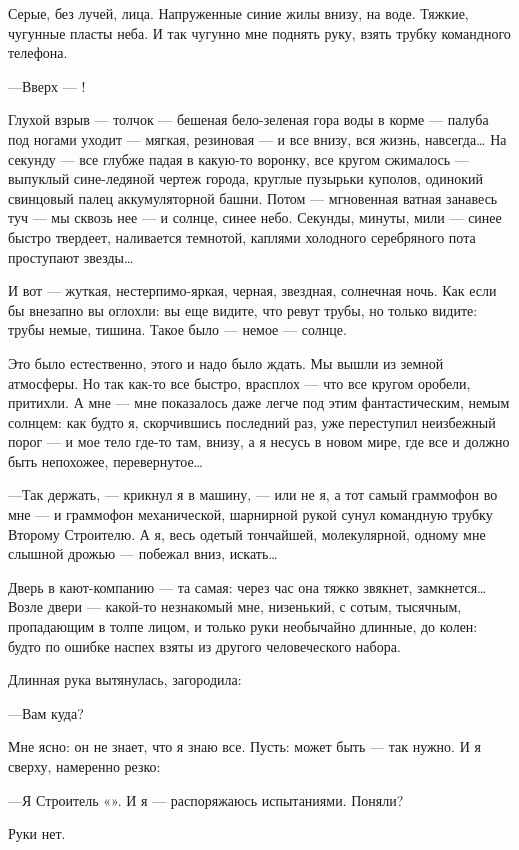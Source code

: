 \documentclass[11pt,openany]{book}
\begin{document}
Серые, без лучей, лица. Напруженные синие жилы внизу, на воде. Тяжкие, чугунные пласты неба. И так чугунно мне поднять руку, взять трубку командного телефона.

---Вверх --- !

Глухой взрыв --- толчок --- бешеная бело-зеленая гора воды в корме --- палуба под ногами уходит --- мягкая, резиновая --- и все внизу, вся жизнь, навсегда\ldots{} На секунду --- все глубже падая в какую-то воронку, все кругом сжималось --- выпуклый сине-ледяной чертеж города, круглые пузырьки куполов, одинокий свинцовый палец аккумуляторной башни. Потом --- мгновенная ватная занавесь туч --- мы сквозь нее --- и солнце, синее небо. Секунды, минуты, мили --- синее быстро твердеет, наливается темнотой, каплями холодного серебряного пота проступают звезды\ldots{}

И вот --- жуткая, нестерпимо-яркая, черная, звездная, солнечная ночь. Как если бы внезапно вы оглохли: вы еще видите, что ревут трубы, но только видите: трубы немые, тишина. Такое было --- немое --- солнце.

Это было естественно, этого и надо было ждать. Мы вышли из земной атмосферы. Но так как-то все быстро, врасплох --- что все кругом оробели, притихли. А мне --- мне показалось даже легче под этим фантастическим, немым солнцем: как будто я, скорчившись последний раз, уже переступил неизбежный порог --- и мое тело где-то там, внизу, а я несусь в новом мире, где все и должно быть непохожее, перевернутое\ldots{}

---Так держать, --- крикнул я в машину, --- или не я, а тот самый граммофон во мне --- и граммофон механической, шарнирной рукой сунул командную трубку Второму Строителю. А я, весь одетый тончайшей, молекулярной, одному мне слышной дрожью --- побежал вниз, искать\ldots{}

Дверь в кают-компанию --- та самая: через час она тяжко звякнет, замкнется\ldots{} Возле двери --- какой-то незнакомый мне, низенький, с сотым, тысячным, пропадающим в толпе лицом, и только руки необычайно длинные, до колен: будто по ошибке наспех взяты из другого человеческого набора.

Длинная рука вытянулась, загородила:

---Вам куда?

Мне ясно: он не знает, что я знаю все. Пусть: может быть --- так нужно. И я сверху, намеренно резко:

---Я Строитель «». И я --- распоряжаюсь испытаниями. Поняли?

Руки нет.
\end{document}
